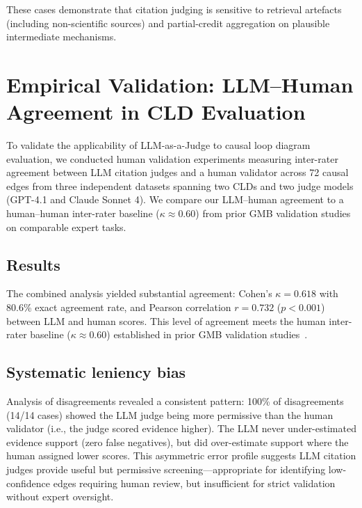These cases demonstrate that citation judging is sensitive to retrieval artefacts (including non-scientific sources) and partial-credit aggregation on plausible intermediate mechanisms.

\section{Empirical Validation: LLM--Human Agreement in CLD Evaluation}
\label{sec:discussion_judge_human_agreement}
To validate the applicability of LLM-as-a-Judge to causal loop diagram evaluation, we conducted human validation experiments measuring inter-rater agreement between LLM citation judges and a human validator across 72 causal edges from three independent datasets spanning two CLDs and two judge models (GPT-4.1 and Claude Sonnet 4). We compare our LLM--human agreement to a human--human inter-rater baseline ($\kappa \approx 0.60$) from prior GMB validation studies on comparable expert tasks.

\subsection{Results} The combined analysis yielded substantial agreement: Cohen's $\kappa = 0.618$ with 80.6\% exact agreement rate, and Pearson correlation $r = 0.732$ ($p < 0.001$) between LLM and human scores. This level of agreement meets the human inter-rater baseline ($\kappa \approx 0.60$) established in prior GMB validation studies~\citep{landis1977measurement}.

\subsection{Systematic leniency bias} Analysis of disagreements revealed a consistent pattern: 100\% of disagreements (14/14 cases) showed the LLM judge being more permissive than the human validator (i.e., the judge scored evidence higher). The LLM never under-estimated evidence support (zero false negatives), but did over-estimate support where the human assigned lower scores. This asymmetric error profile suggests LLM citation judges provide useful but permissive screening---appropriate for identifying low-confidence edges requiring human review, but insufficient for strict validation without expert oversight.


